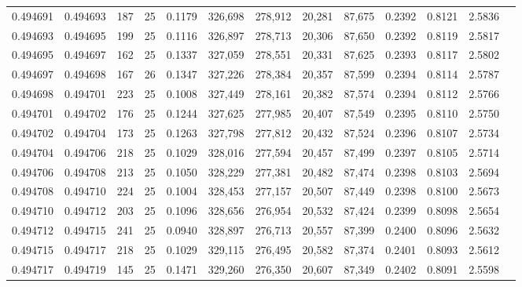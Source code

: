 \begin{tabular}{rrrrrrrrrrrrr}
0.494691 & 0.494693 &   187 &  25 &                                     0.1179 & 326,698 & 278,912 &  20,281 &  87,675 & 0.2392 & 0.8121 & 2.5836 \\
0.494693 & 0.494695 &   199 &  25 &                                     0.1116 & 326,897 & 278,713 &  20,306 &  87,650 & 0.2392 & 0.8119 & 2.5817 \\
0.494695 & 0.494697 &   162 &  25 &                                     0.1337 & 327,059 & 278,551 &  20,331 &  87,625 & 0.2393 & 0.8117 & 2.5802 \\
0.494697 & 0.494698 &   167 &  26 &                                     0.1347 & 327,226 & 278,384 &  20,357 &  87,599 & 0.2394 & 0.8114 & 2.5787 \\
0.494698 & 0.494701 &   223 &  25 &                                     0.1008 & 327,449 & 278,161 &  20,382 &  87,574 & 0.2394 & 0.8112 & 2.5766 \\
0.494701 & 0.494702 &   176 &  25 &                                     0.1244 & 327,625 & 277,985 &  20,407 &  87,549 & 0.2395 & 0.8110 & 2.5750 \\
0.494702 & 0.494704 &   173 &  25 &                                     0.1263 & 327,798 & 277,812 &  20,432 &  87,524 & 0.2396 & 0.8107 & 2.5734 \\
0.494704 & 0.494706 &   218 &  25 &                                     0.1029 & 328,016 & 277,594 &  20,457 &  87,499 & 0.2397 & 0.8105 & 2.5714 \\
0.494706 & 0.494708 &   213 &  25 &                                     0.1050 & 328,229 & 277,381 &  20,482 &  87,474 & 0.2398 & 0.8103 & 2.5694 \\
0.494708 & 0.494710 &   224 &  25 &                                     0.1004 & 328,453 & 277,157 &  20,507 &  87,449 & 0.2398 & 0.8100 & 2.5673 \\
0.494710 & 0.494712 &   203 &  25 &                                     0.1096 & 328,656 & 276,954 &  20,532 &  87,424 & 0.2399 & 0.8098 & 2.5654 \\
0.494712 & 0.494715 &   241 &  25 &                                     0.0940 & 328,897 & 276,713 &  20,557 &  87,399 & 0.2400 & 0.8096 & 2.5632 \\
0.494715 & 0.494717 &   218 &  25 &                                     0.1029 & 329,115 & 276,495 &  20,582 &  87,374 & 0.2401 & 0.8093 & 2.5612 \\
0.494717 & 0.494719 &   145 &  25 &                                     0.1471 & 329,260 & 276,350 &  20,607 &  87,349 & 0.2402 & 0.8091 & 2.5598 \\

\end{tabular}
